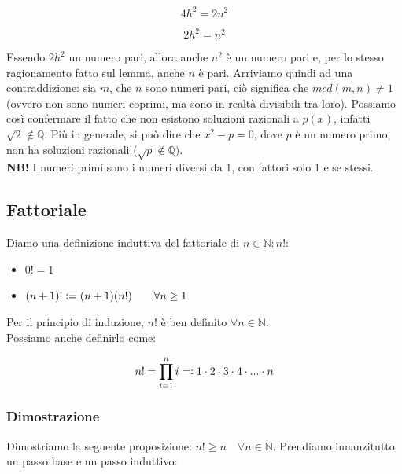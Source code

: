 \documentclass{article}
\begin{document}
\begin{equation*}
    4h^2 = 2n^2
\end{equation*}

\begin{equation*}
    2h^2 = n^2
\end{equation*}

\noindent Essendo $2h^2$ un numero pari, allora anche $n^2$ è un numero pari e, per lo stesso ragionamento fatto sul lemma, anche $n$ è pari. Arriviamo quindi ad una contraddizione: sia $m$, che $n$ sono numeri pari, ciò significa che $mcd(m,n) \neq 1$ (ovvero non sono numeri coprimi, ma sono in realtà divisibili tra loro). Possiamo così confermare il fatto che non esistono soluzioni razionali a $p(x)$, infatti $\sqrt{2} \notin \mathbb{Q}$. Più in generale, si può dire che $x^2 - p = 0$, dove $p$ è un numero primo, non ha soluzioni razionali ($\sqrt{p} \notin \mathbb{Q})$.\\

\noindent\textbf{NB!} I numeri primi sono i numeri diversi da 1, con fattori solo 1 e se stessi.

\subsection{Fattoriale}
Diamo una definizione induttiva del fattoriale di $n \in \mathbb{N}: n!$: 

\begin{itemize}
    \item $0! = 1$
    \item $(n+1)! \vcentcolon = (n+1)(n!) \qquad \forall n \geq 1$
\end{itemize}

\noindent Per il principio di induzione, $n!$ è ben definito $\forall n \in \mathbb{N}$. \\

\noindent Possiamo anche definirlo come:

\begin{equation*}
    n! = \prod_{i=1}^n i = \vcentcolon 1 \cdot 2 \cdot 3 \cdot 4 \cdot ... \cdot n
\end{equation*}

\subsubsection{Dimostrazione}
Dimostriamo la seguente proposizione: $n! \geq n \quad \forall n \in \mathbb{N}$. Prendiamo innanzitutto un passo base e un passo induttivo:
\end{document}
